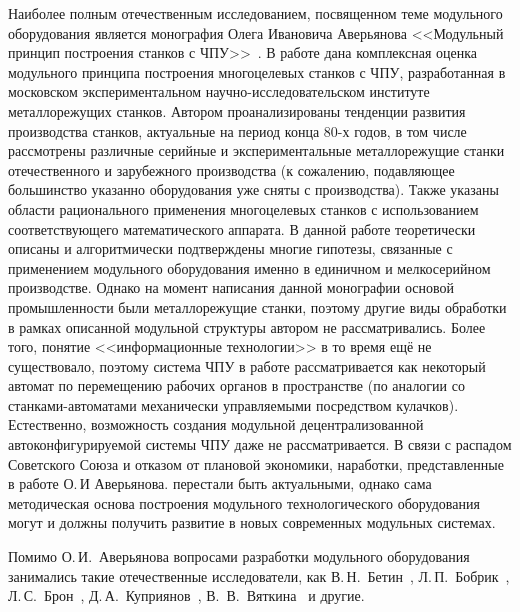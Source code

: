 Наиболее полным отечественным исследованием, посвященном теме модульного оборудования является монография Олега Ивановича Аверьянова <<Модульный принцип построения станков с ЧПУ>>~\cite{averianov}. В работе дана комплексная оценка модульного принципа построения многоцелевых станков с ЧПУ, разработанная в московском экспериментальном научно-исследовательском институте металлорежущих станков. Автором проанализированы тенденции развития производства станков, актуальные на период конца 80-х годов, в том числе рассмотрены различные серийные и экспериментальные металлорежущие станки отечественного и зарубежного производства (к сожалению, подавляющее большинство указанно оборудования уже сняты с производства). Также указаны области рационального применения многоцелевых станков с использованием соответствующего математического аппарата. В данной работе теоретически описаны и алгоритмически подтверждены многие гипотезы, связанные с применением модульного оборудования именно в единичном и мелкосерийном производстве.  Однако на момент написания данной монографии основой промышленности были металлорежущие станки, поэтому другие виды обработки в рамках описанной модульной структуры автором не рассматривались. Более того, понятие <<информационные технологии>> в то время ещё не существовало, поэтому система ЧПУ в работе рассматривается как некоторый автомат по перемещению рабочих органов в пространстве (по аналогии со станками-автоматами механически управляемыми посредством кулачков). Естественно, возможность создания модульной децентрализованной автоконфигурируемой системы ЧПУ даже не рассматривается. В связи с распадом Советского Союза и отказом от плановой экономики, наработки, представленные в работе О.\,И Аверьянова. перестали быть актуальными, однако сама методическая основа построения модульного технологического оборудования могут и должны получить развитие в новых современных модульных системах.

Помимо О.\,И.~Аверьянова вопросами разработки модульного оборудования занимались такие отечественные исследователи, как В.\,Н.~Бетин~\cite{betin}, Л.\,П.~Бобрик~\cite{bobrik}, Л.\,С.~Брон~\cite{bron}, Д.\,А.~Куприянов~\cite{kuprianov}, В.~В.~Вяткина~\cite{minhat2009stepncmilluoa} и другие. 
	
